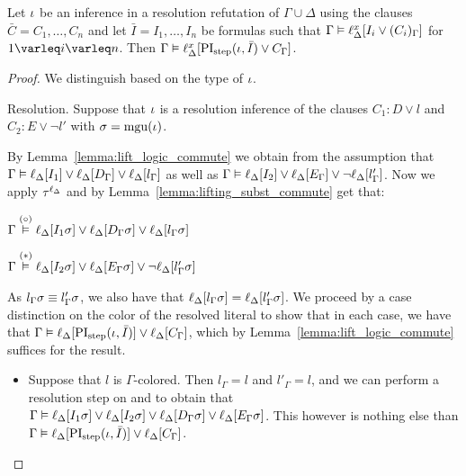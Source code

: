 \begin{lemma}
	\label{lemma:gamma_entails_step}
	Let $\iota$ be an inference in a resolution refutation of $\Gamma \cup \Delta$ using the clauses $\bar C = C_1, \dots, C_n$
	and let $\bar I = I_1, \dots, I_n$ be formulas such that 
	$\Gamma \entails \lifdelta{I_i \lor\nolinebreak (C_i)_\Gamma} $ for $1 \varleq i \varleq n$.
	Then
	$\Gamma \entails \lifdelta{\PIstep(\inference, \bar I) \lor\nolinebreak C_\Gamma} $.
\end{lemma}
\begin{proof}
	We distinguish based on the type of $\iota$.
	\begin{description}
		\item{Resolution.}
			Suppose that $\iota$ is a resolution inference of the clauses $C_1: D \lor l$ and $C_2: E \lor \lnot l'$ with $\sigma = \operatorname{mgu}(\iota)$.

			By Lemma~\ref{lemma:lift_logic_commute} we obtain from the assumption that
			$\Gamma \vDash \ell_{\Delta}[I_1] \lor \ell_{\Delta}[D_\Gamma] \lor \ell_{\Delta}[l_\Gamma]$
			as well as 
			$\Gamma \vDash \ell_{\Delta}[I_2] \lor \ell_{\Delta}[E_\Gamma] \lor \lnot \ell_{\Delta}[l'_\Gamma]$.
			Now we apply $\tau^{\ell_\Delta}$ and by Lemma~\ref{lemma:lifting_subst_commute} get that:

			$\Gamma \stackrel{(\circ)}{\vDash} \ell_{\Delta}[I_1\sigma] \lor \ell_{\Delta}[D_\Gamma\sigma] \lor \ell_{\Delta}[l_\Gamma\sigma]$

			$\Gamma \stackrel{(*)}{\vDash} \ell_{\Delta}[I_2\sigma] \lor \ell_{\Delta}[E_\Gamma\sigma] \lor \lnot \ell_{\Delta}[l'_\Gamma\sigma]$

			As $l_\Gamma\sigma \equiv l'_\Gamma\sigma$,
			we also have that
			$\ell_{\Delta}[l_\Gamma\sigma] = \ell_{\Delta}[l'_\Gamma\sigma]$.
			We proceed by a case distinction on the color of the resolved literal to show that in each case, we have that
			$\Gamma \vDash \ell_{\Delta}[\operatorname{PI}_{\mathrm{step}}(\iota, \bar I)] \lor \ell_{\Delta}[C_\Gamma]$,
			which by Lemma~\ref{lemma:lift_logic_commute} suffices for the result.
			\begin{itemize}
				\item Suppose that $l$ is $\Gamma$-colored.
					Then $l_\Gamma = l$ and $l'_\Gamma = l$, and we can perform a resolution step on \markA{} and \markB{} to obtain that
					$\Gamma \vDash
					\ell_{\Delta}[I_1\sigma] \lor
					\ell_{\Delta}[I_2\sigma] \lor 
					\ell_{\Delta}[D_\Gamma\sigma]  \lor
					\ell_{\Delta}[E_\Gamma\sigma]$.
					This however is nothing else than $\Gamma \vDash \ell_{\Delta}[\operatorname{PI}_{\mathrm{step}}(\iota, \bar I)] \lor \ell_{\Delta}[C_\Gamma]$.


\end{itemize}
\end{description}
\end{proof}
